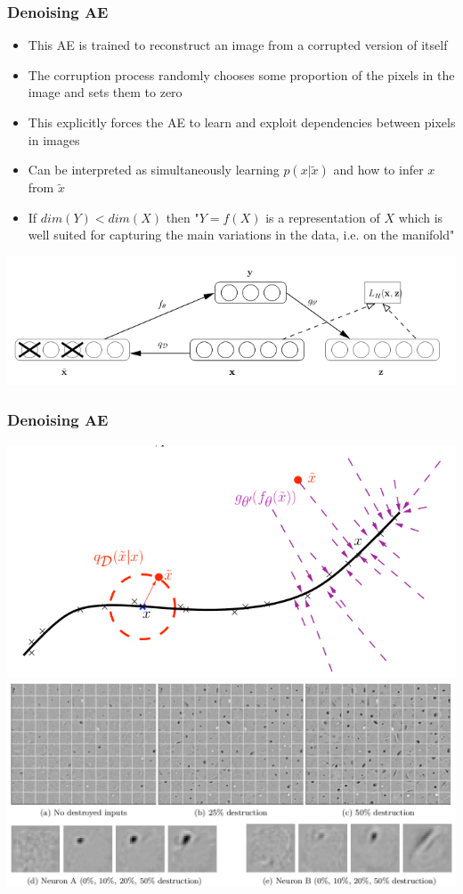 \documentclass{beamer}
\begin{document}
\begin{frame}
\frametitle{Denoising AE} 
\begin{itemize}
\item{This AE is trained to reconstruct an image from a corrupted version of itself} 
\item{The corruption process randomly chooses some proportion of the pixels in the image and sets them to zero}   
\item{This explicitly forces the AE to learn and exploit dependencies between pixels in images} 
\item{Can be interpreted as simultaneously learning $p(x|\tilde{x})$ and how to infer $x$ from $\tilde{x}$}
\item{If $dim(Y)<dim(X)$ then "$Y=f(X)$ is a representation of $X$ which is well suited for capturing the main variations in the data, i.e. on the manifold"}
\end{itemize} 
\begin{center}
\includegraphics[scale=0.25]{DAE.png}
\end{center} 
\end{frame} 

\begin{frame}
\frametitle{Denoising AE}  
\begin{center}
\includegraphics[scale=0.25]{DAE2.png}\\
\includegraphics[scale=0.25]{DAE3.png}
\end{center} 
\end{frame} 
\end{document}
